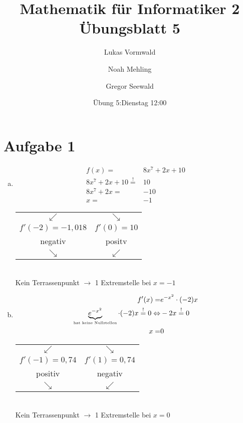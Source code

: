\documentclass[11pt,a4paper]{article}
\title{Mathematik für Informatiker 2\\Übungsblatt 5}
\author{Lukas Vormwald \and Noah Mehling \and Gregor Seewald}
\date{Übung 5:Dienstag 12:00}
\begin{document}
  \maketitle
  \section*{Aufgabe 1}
    \begin{enumerate}[a)]
      \item
        \begin{align*}
            f(x) =& 8x^7 + 2x + 10 \\
            8x^7 + 2x + 10 \stackrel{!}{=}& 10 \\
            8x^7 + 2x =& -10 \\
            x =& -1
        \end{align*}
        \begin{center}
          \begin{tabular}{cc}
            $\swarrow$&$\searrow$\\
            $f'(-2)=-1,018$&$f'(0)=10$\\
            negativ&positv\\
            $\searrow$&$\swarrow$\\
          \end{tabular}\\
          Kein Terrassenpunkt $\to$ 1 Extremstelle bei $x=-1$
        \end{center}
      \item
        \begin{align*}
          f'(x) =& e^{-x^2} \cdot (-2)x \\
          \underbrace{e^{-x^2}}_{\text{\tiny hat keine Nullstellen}} \cdot (-2) x \stackrel{!}{=} 0 \Leftrightarrow& -2x \stackrel{!}{=} 0\\
          x=&0
        \end{align*}
        \begin{center}
          \begin{tabular}{cc}
            $\swarrow$&$\searrow$\\
            $f'(-1)=0,74$&$f'(1)=0,74$\\
            positiv&negativ\\
            $\searrow$&$\swarrow$\\
          \end{tabular}\\
          Kein Terrassenpunkt $\to$ 1 Extremstelle bei $x=0$
        \end{center}
    \end{enumerate}
\end{document}
